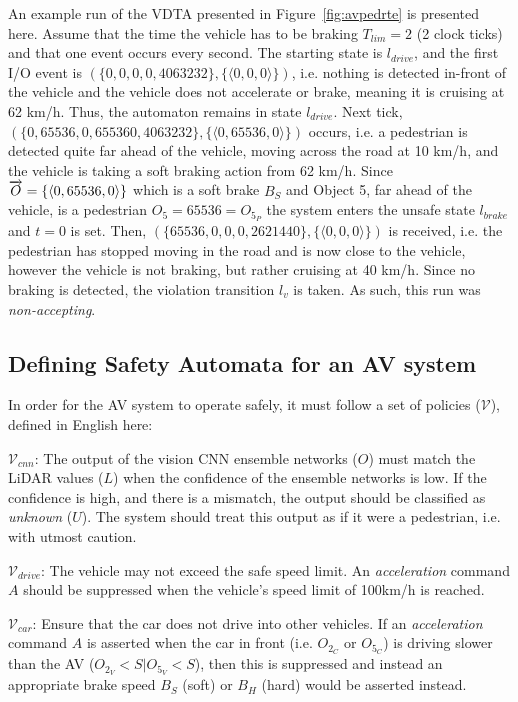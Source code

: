 \begin{example}
	An example run of the VDTA presented in Figure~\ref{fig:avpedrte} is presented here.
	Assume that the time the vehicle has to be braking $T_{lim} = 2$ (2 clock ticks) and that one event occurs every second. 
	The starting state is $l_{drive}$, and the first I/O event is $(\{0, 0, 0, 0, 4063232\}, \{\langle 0, 0, 0 \rangle\})$, i.e. nothing is detected in-front of the vehicle and the vehicle does not accelerate or brake, meaning it is cruising at 62 km/h.
	Thus, the automaton remains in state $l_{drive}$.
	Next tick, $(\{0, 65536, 0, 655360, 4063232\}, \{\langle 0, 65536, 0 \rangle\})$ occurs, i.e. a pedestrian is detected quite far ahead of the vehicle, moving across the road at 10 km/h, and the vehicle is taking a soft braking action from 62 km/h.
	Since $\overrightarrow{O} = \{\langle 0, 65536, 0 \rangle\}$ which is a soft brake $B_S$ and Object 5, far ahead of the vehicle, is a pedestrian $O_5 = 65536 = O_{5_P}$ the system enters the unsafe state $l_{brake}$ and $t = 0$ is set.
	Then,  $(\{65536, 0, 0, 0, 2621440\}, \{\langle 0, 0, 0 \rangle\})$ is received, i.e. the pedestrian has stopped moving in the road and is now close to the vehicle, however the vehicle is not braking, but rather cruising at 40 km/h.
	Since no braking is detected, the violation transition $l_v$ is taken.
	As such, this run was \textit{non-accepting}.
\end{example}

\subsection{Defining Safety Automata for an \ac{AV} system}
In order for the \ac{AV} system to operate safely, it must follow a set of policies ($\mathcal{V}$), defined in English here:

$\mathcal{V}_{cnn}$: The output of the vision \ac{CNN} ensemble networks ($O$) must match the \ac{LiDAR} values ($L$) when the confidence of the ensemble networks is low. 
If the confidence is high, and there is a mismatch, the output should be classified as \textit{unknown} ($U$).
The system should treat this output as if it were a pedestrian, i.e. with utmost caution.

$\mathcal{V}_{drive}$: The vehicle may not exceed the safe speed limit. 
An \textit{acceleration} command $A$ should be suppressed when the vehicle's speed limit of 100km/h is reached.

$\mathcal{V}_{car}$: Ensure that the car does not drive into other vehicles. If an \textit{acceleration} command $A$ is asserted when the car in front (i.e. $O_{2_C}$ or $O_{5_C}$) is driving slower than the \ac{AV} ($O_{2_V}<S|O_{5_V}<S$), then this is suppressed and instead an appropriate brake speed $B_S$ (soft) or $B_H$ (hard) would be asserted instead.


